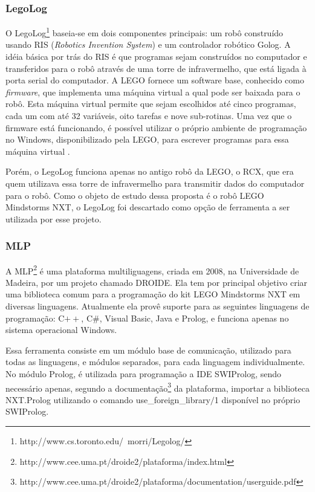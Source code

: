 \subsubsection{LegoLog}
O LegoLog\footnote{http://www.cs.toronto.edu/~morri/Legolog/} baseia-se em dois componentes principais: um robô construído usando RIS (\textit{Robotics Invention System}) e um controlador robótico Golog. A idéia básica por trás do RIS é que programas sejam construídos no computador e transferidos para o robô através de uma torre de infravermelho, que está ligada à porta serial do computador. A LEGO fornece um software base, conhecido como \textit{firmware}, que implementa uma máquina virtual a qual pode ser baixada para o robô.  Esta máquina virtual permite que sejam escolhidos até cinco programas, cada um com até 32 variáveis, oito tarefas e nove sub-rotinas. Uma vez que o firmware está funcionando, é possível utilizar o próprio ambiente de programação no Windows, disponibilizado pela LEGO, para escrever programas para essa máquina virtual \cite{levesque2000legolog}. 

Porém, o LegoLog funciona apenas no antigo robô da LEGO, o RCX, que era quem utilizava essa torre de infravermelho para transmitir dados do computador para o robô. Como o objeto de estudo dessa proposta é o robô LEGO Mindstorms NXT, o LegoLog foi descartado como opção de ferramenta a ser utilizada por esse projeto.

\subsubsection{MLP}
A MLP\footnote{http://www.cee.uma.pt/droide2/plataforma/index.html} é uma plataforma multiliguagens, criada em 2008, na Universidade de Madeira, por um projeto chamado DROIDE. Ela tem por principal objetivo criar uma biblioteca comum para a programação do kit LEGO Mindstorms NXT em diversas linguagens. Atualmente ela provê suporte para as seguintes linguagens de programação: C$++$, C\#, Visual Basic, Java e Prolog, e funciona apenas no sistema operacional Windows. 

Essa ferramenta consiste em um módulo base de comunicação, utilizado para todas as linguagens, e módulos separados, para cada linguagem individualmente. No módulo Prolog, é utilizada para programação a IDE SWIProlog, sendo necessário apenas, segundo a documentação\footnote{http://www.cee.uma.pt/droide2/plataforma/documentation/userguide.pdf} da plataforma, importar a biblioteca NXT.Prolog utilizando o comando use\_foreign\_library$/$1 disponível no próprio SWIProlog. 

